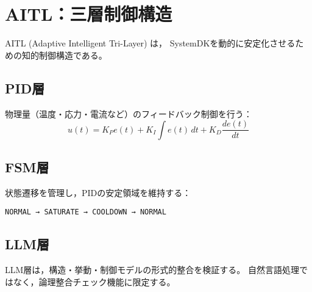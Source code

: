 \section{AITL：三層制御構造}
AITL (Adaptive Intelligent Tri-Layer) は，
SystemDKを動的に安定化させるための知的制御構造である。

\subsection{PID層}
物理量（温度・応力・電流など）のフィードバック制御を行う：
\begin{equation}
u(t) = K_P e(t) + K_I \int e(t)\,dt + K_D \frac{de(t)}{dt}
\end{equation}

\subsection{FSM層}
状態遷移を管理し，PIDの安定領域を維持する：
\begin{center}
\texttt{NORMAL → SATURATE → COOLDOWN → NORMAL}
\end{center}

\subsection{LLM層}
LLM層は，構造・挙動・制御モデルの形式的整合を検証する。
自然言語処理ではなく，論理整合チェック機能に限定する。
